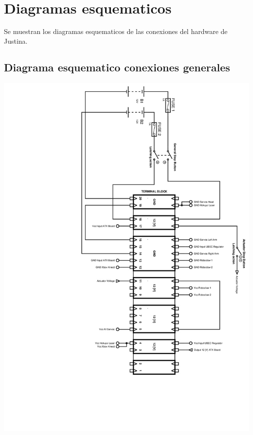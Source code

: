 \documentclass[a4paper]{book}
\begin{document}
\vfill
\pagebreak

\section{Diagramas esquematicos}
Se muestran los diagramas esquematicos de las conexiones del hardware de Justina.

\pagebreak

\subsection{Diagrama esquematico conexiones generales}

\begin{center}
\includegraphics[width=1.1\textwidth]{Figures/Hardware/Esquematicos/JustinaWiringDiagram.jpg}
\label{fig:Hardware:Partes:Diagrama:Esquematico:General}
\end{center}
\end{document}

